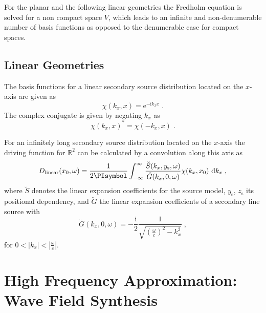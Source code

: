 \documentclass[a4paper]{book}
\newcommand{\PI}{\PIsymbol}%
\newcommand{\I}{\mathrm{i}}                          %
\newcommand{\E}{\mathrm{e}}                          %
\newcommand{\D}[1]{\mathop{\mathrm{d}{#1}}}          %
\newcommand{\omegac}{\frac{\omega}{c}}               %
\newcommand{\R}{\mathbb{R}}                          %
\newcommand{\qc}{\;,}                                             %
\newcommand{\qp}{\;.}                                             %
\begin{document}
{For the planar and the following linear geometries the Fredholm equation is
solved for a non compact space $V$, which leads to an infinite and
non-denumerable number of basis functions as
opposed to the denumerable case for compact spaces.\cite{Schultz2014}


\subsection{Linear Geometries}
\label{sec:linear_geometries}

The basis functions for a linear secondary source distribution
located on the $x$-axis are given as
%
\begin{equation}
    \chi(k_x,x) = \E^{-\I k_x x} \qp
    \label{eq:linear_harmonics}
\end{equation}
%
The complex conjugate is given by negating $k_x$ as
%
\begin{equation}
    \chi(k_x,x)^* = \chi(-k_x,x) \qp
\end{equation}
%

For an infinitely long secondary source distribution located on the $x$-axis the
driving function for $\R^2$ can be calculated by a convolution along this axis
as\cite[Compare (3.73) in][]{Ahrens2012}
%
\begin{equation}
    D_\text{linear}(x_0,\omega) = \frac{1}{2\PI} \int_{-\infty}^\infty
    \frac{\breve{S}(k_x,y_\text{s},\omega)}{\breve{G}(k_x,0,\omega)}
    \chi(k_x,x_0) \, \D{k_x} \qc
    \label{eq:D_linear}
\end{equation}
%
where $\breve{S}$ denotes the linear expansion coefficients for the
source model, $y_\text{s}$, $z_\text{s}$ its positional dependency,
and $\breve{G}$ the linear expansion coefficients of a secondary line source with
%
\begin{equation}
    \breve{G}(k_x,0,\omega) = -\frac{\I}{2} \frac{1}{\sqrt{(\omegac)^2-k_x^2}}
    \qc
    \label{eq:G_linear}
\end{equation}
%
for $0<|k_x|<|\omegac|$.


\section[Wave Field Synthesis]{High Frequency Approximation: Wave Field Synthesis}
\label{sec:WFS}

}
\end{document}
